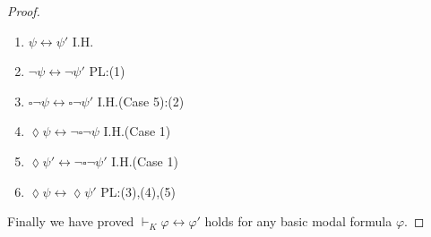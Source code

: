 \documentclass{article}
\begin{document}
\begin{proof}
\begin{enumerate}[{Case} 1: ]
	\begin{enumerate}[(1)]
		\item $\psi \leftrightarrow \psi'$ \hfill I.H.
		\item $\neg \psi \leftrightarrow \neg \psi'$ \hfill PL:(1)
		\item $\square \neg \psi \leftrightarrow \square \neg \psi'$ \hfill I.H.(Case 5):(2)
		\item $\lozenge \psi \leftrightarrow \neg \square \neg \psi$ \hfill I.H.(Case 1)
		\item $\lozenge \psi' \leftrightarrow \neg \square \neg \psi'$ \hfill I.H.(Case 1)
		\item $\lozenge \psi \leftrightarrow \lozenge \psi'$ \hfill PL:(3),(4),(5)
	\end{enumerate}
	\end{enumerate}
	
	Finally we have proved $\vdash_K \varphi \leftrightarrow \varphi'$ holds for any basic modal formula $\varphi$. 
\end{proof}

%
\end{document}
